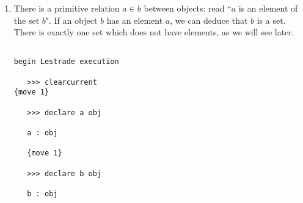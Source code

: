 \documentclass[12pt]{article}
\begin{document}
\begin{enumerate}
\begin{verbatim}
   {move 1}

   >>> postulate Subs aisb P, pev that P b

   Subs : [(.a_1 : obj), (.b_1 : obj), (aisb_1 
       : that .a_1 = .b_1), (P_1 : [(a_2 
          : obj) => (--- : prop)]), (pev_1 
       : that P_1 (.a_1)) => (--- : that 
       P_1 (.b_1))]

   {move 0}

   >>> define Subs2 aisb pev : Subs aisb \
       P, pev

   Subs2 : [(.a_1 : obj), (.b_1 : obj), (aisb_1 
       : that .a_1 = .b_1), (.P_1 : [(a_2 
          : obj) => (--- : prop)]), (pev_1 
       : that .P_1 (.a_1)) => 
       ({def} Subs (aisb_1, .P_1, pev_1) : that 
       .P_1 (.b_1))]

   Subs2 : [(.a_1 : obj), (.b_1 : obj), (aisb_1 
       : that .a_1 = .b_1), (.P_1 : [(a_2 
          : obj) => (--- : prop)]), (pev_1 
       : that .P_1 (.a_1)) => (--- : that 
       .P_1 (.b_1))]

   {move 0}
end Lestrade execution

\end{verbatim}

We implement {\bf B} as the Lestrade primitive sort {\tt obj}.  We implement classes (whatever exactly they are here) as propositional functions
on {\tt obj}.  We implement equality  and existence of elements of a class as primitives.  We defer the declaration of inequality until we can define it.

We will add rules for reasoning as it becomes clear from the text what we need along these lines.  Rules for the existential quantifier and equality are now present.

\item  There is a primitive relation $a \in b$ between objects:  read ``$a$ is an element of the set $b$".  If an object $b$ has an element $a$, we
can deduce that $b$ is a set.  There is exactly one set which does not have elements, as we will see later.

\begin{verbatim}

begin Lestrade execution

   >>> clearcurrent
{move 1}

   >>> declare a obj

   a : obj

   {move 1}

   >>> declare b obj

   b : obj


\end{verbatim}
\end{enumerate}
\end{document}
